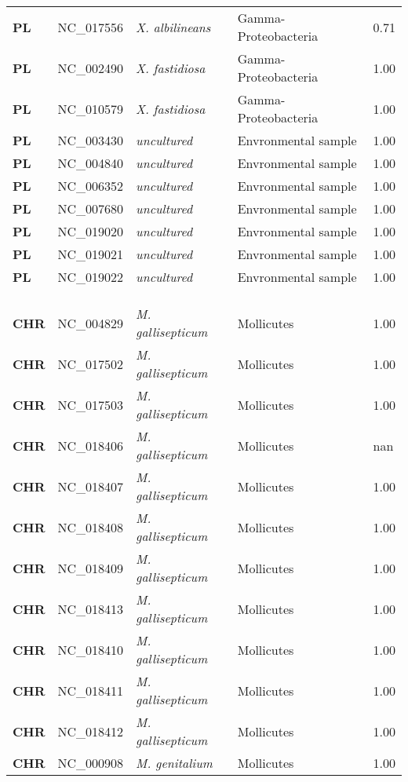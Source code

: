 \begin{adjustwidth}{-3cm}{2cm}
{\begin{supertabular}{>{\bfseries}l|p{0.1\textwidth}p{0.14\textwidth}l|l}
PL & NC\_017556 & \textit{X. albilineans} & Gamma-Proteobacteria & 0.71\\
PL & NC\_002490 & \textit{X. fastidiosa} & Gamma-Proteobacteria & 1.00\\
PL & NC\_010579 & \textit{X. fastidiosa} & Gamma-Proteobacteria & 1.00\\
PL & NC\_003430 & \textit{uncultured } & Envronmental sample & 1.00\\
PL & NC\_004840 & \textit{uncultured } & Envronmental sample & 1.00\\
PL & NC\_006352 & \textit{uncultured } & Envronmental sample & 1.00\\
PL & NC\_007680 & \textit{uncultured } & Envronmental sample & 1.00\\
PL & NC\_019020 & \textit{uncultured } & Envronmental sample & 1.00\\
PL & NC\_019021 & \textit{uncultured } & Envronmental sample & 1.00\\
PL & NC\_019022 & \textit{uncultured } & Envronmental sample & 1.00\\
\\
\\
\hline\\
CHR & NC\_004829 & \textit{M. gallisepticum} & Mollicutes & 1.00\\
CHR & NC\_017502 & \textit{M. gallisepticum} & Mollicutes & 1.00\\
CHR & NC\_017503 & \textit{M. gallisepticum} & Mollicutes & 1.00\\
CHR & NC\_018406 & \textit{M. gallisepticum} & Mollicutes & nan\\
CHR & NC\_018407 & \textit{M. gallisepticum} & Mollicutes & 1.00\\
CHR & NC\_018408 & \textit{M. gallisepticum} & Mollicutes & 1.00\\
CHR & NC\_018409 & \textit{M. gallisepticum} & Mollicutes & 1.00\\
CHR & NC\_018413 & \textit{M. gallisepticum} & Mollicutes & 1.00\\
CHR & NC\_018410 & \textit{M. gallisepticum} & Mollicutes & 1.00\\
CHR & NC\_018411 & \textit{M. gallisepticum} & Mollicutes & 1.00\\
CHR & NC\_018412 & \textit{M. gallisepticum} & Mollicutes & 1.00\\
CHR & NC\_000908 & \textit{M. genitalium} & Mollicutes & 1.00\\

\end{supertabular}}
\end{adjustwidth}
